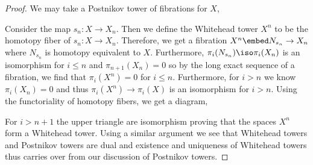\documentclass[12pt]{extarticle}
\begin{document}
\begin{proof}
We may take a Postnikov tower of fibrations for $X$,
\begin{center}
\end{center}
Consider the map $s_n : X \to X_n$. Then we define the Whitehead tower $X^n$ to be the homotopy fiber of $s_n : X \to X_n$. Therefore, we get a fibration $X^n \embed N_{s_n} \to X_n$ where $N_{s_n}$ is homotopy equivalent to $X$. Furthermore, $\pi_i(N_{s_n}) \iso \pi_i(X_n)$ is an isomorphism for $i \le n$ and $\pi_{n+1}(X_n) = 0$ so by the long exact sequence of a fibration, we find that $\pi_i(X^n) = 0$ for $i \le n$. Furthermore, for $i > n$ we know $\pi_i(X_n) = 0$ and thus $\pi_i(X^n) \to \pi_i(X)$ is an isomorphism for $i > n$. Using the functoriality of homotopy fibers, we get a diagram,
\begin{center}
\end{center}
For $i > n + 1$ the upper triangle are isomorphism proving that the spaces $X^n$ form a Whitehead tower. Using a similar argument we see that Whitehead towers and Postnikov towers are dual and existence and uniqueness of Whitehead towers thus carries over from our discussion of Postnikov towers.
\end{proof}
\end{document}
